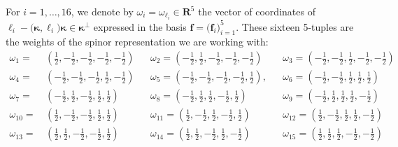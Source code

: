 \documentclass[11pt]{amsart}
\begin{document}
For $i=1,\ldots,16$, we denote by $\omega_i
=\omega_{\boldsymbol{\ell}_i}
\in  \mathbf R^5 $  the vector of coordinates of  $\boldsymbol{\ell}_i-\big(\boldsymbol{\kappa},\boldsymbol{\ell}_i\big)\boldsymbol{\kappa}\in \boldsymbol{\kappa}^\perp $ expressed in the basis $\boldsymbol{f}=(\boldsymbol{f}_i\big)_{i=1}^5$. These sixteen 5-tuples are the weights of the spinor representation we are working with:
\begin{align}%
\label{Eq:Weights-R5}
 \nonumber
\omega_{{1}}=&\, \left({\frac{1}{2}}, -{\frac{1}{2}}, -{\frac{1}{2}}, -{\frac{1}{
2}}, -{\frac{1}{2}}\right)  && 
\omega_{{2}}=\left(-{\frac{1}{2}}, {\frac{1}{2}}, -{
\frac{1}{2}}, -{\frac{1}{2}}, -{\frac{1}{2}}\right) 
&& \omega_{{3}}=\left(-{\frac{1}{
2}}, -{\frac{1}{2}}, {\frac{1}{2}}, -{\frac{1}{2}}, -{\frac{1}{2}}
\right) 
\\
 \nonumber
\omega_{{4}}=&\,  \left(-{\frac{1}{2}}, -{\frac{1}{2}}, -{\frac{1}{2}}, {\frac{
1}{2}}, -{\frac{1}{2}}\right)
&& 
\omega_{{5}}=
 \left(-{\frac{1}{2}}, -{\frac{1}{2}}, -
{\frac{1}{2}}, -{\frac{1}{2}}, {\frac{1}{2}}\right),
&&
\omega_{{6}}=
 \left(-{\frac{1}{
2}}, -{\frac{1}{2}}, {\frac{1}{2}}, {\frac{1}{2}}, {\frac{1}{2}}\right)
\\
\omega_{{7}}=&\, 
 \left(-{\frac{1}{2}}, {\frac{1}{2}}, -{\frac{1}{2}}, {\frac{1}{2}}
, {\frac{1}{2}}\right)
&&
\omega_{{8}}=
 \left(-{\frac{1}{2}}, {\frac{1}{2}}, {\frac{1}{2}}, -{\frac{1}{2}}, {\frac{1}{2}}\right)
&&
\omega_{{9}}=
 \left(-{\frac{1}{2}}, {\frac{1}{2}}, {\frac{1}{2}}, {\frac{1}{2}}, -{\frac{1}{2}}\right)
 \\
 \nonumber
\omega_{{10}}=&\, 
\left({\frac{1}{2}}, -{\frac{1}{2}}, -{\frac{1}{2}}, {\frac{1}{2}}, {
\frac{1}{2}}\right)
&&
\omega_{{11}}=
 \left({\frac{1}{2}}, -{\frac{1}{2}}, {\frac{1}{2}}, -{\frac{1}{2}}, {\frac{1}{2}}\right)
&&
\omega_{{12}}= 
 \left({\frac{1}{2}}, -{\frac{1}{2}}, {\frac{1}{2}}, {\frac{1}{2}}, -{\frac{1}{2}}\right)
  \\
\omega_{{13}}=&\,  \left({
\frac{1}{2}}, {\frac{1}{2}}, -{\frac{1}{2}}, -{\frac{1}{2}}, {\frac{1}{2}}\right)
&& \omega_{{14}}=
 \left({\frac{1}{2}}, {\frac{1}{2}}, -{\frac{1}{2}}, {
\frac{1}{2}}, -{\frac{1}{2}}\right)
&& \omega_{{15}}=
 \left({\frac{1}{2}}, {\frac{1}{2}
}, {\frac{1}{2}}, -{\frac{1}{2}}, -{\frac{1}{2}}\right)
 \nonumber
\end{align}%
\end{document}
